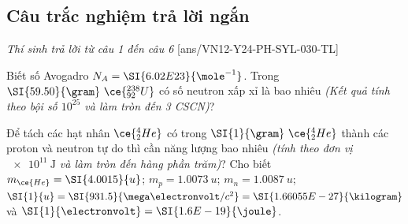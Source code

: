 \subsection{Câu trắc nghiệm trả lời ngắn} \textit{Thí sinh trả lời từ câu 1 đến câu 6}
\setcounter{ex}{0}
[ans/VN12-Y24-PH-SYL-030-TL]
\begin{ex}
	Biết số Avogadro $N_A=\SI{6.02E23}{\mole^{-1}}$. Trong $\SI{59.50}{\gram}\ \ce{^{238}_{92}U}$ có số neutron xấp xỉ là bao nhiêu \textit{(Kết quả tính theo bội số $10^{25}$ và làm tròn đến 3 CSCN)}?
\end{ex}
\begin{ex}
	Để tách các hạt nhân $\ce{^4_2He}$ có trong $\SI{1}{\gram}\ \ce{^4_2He}$ thành các proton và neutron tự do thì cần năng lượng bao nhiêu \textit{(tính theo đơn vị $\SI{e11}{\joule}$ và làm tròn đến hàng phần trăm)}? Cho biết $m_{\ce{He}}=\SI{4.0015}{u}$; $m_p=\SI{1.0073}{u}$; $m_n=\SI{1.0087}{u}$; $\SI{1}{u}=\SI{931.5}{\mega\electronvolt/c^2}=\SI{1.66055E-27}{\kilogram}$ và $\SI{1}{\electronvolt}=\SI{1.6E-19}{\joule}$.
\end{ex}
